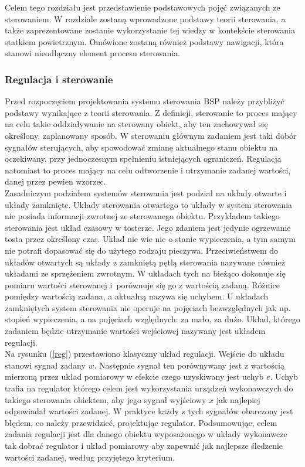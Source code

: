 Celem tego rozdziału jest przedstawienie podstawowych pojęć związanych ze sterowaniem. W rozdziale zostaną wprowadzone podstawy teorii sterowania, a także zaprezentowane zostanie wykorzystanie tej wiedzy w kontekście sterowania statkiem powietrznym. Omówione zostaną również podstawy nawigacji, która stanowi nieodłączny element procesu sterowania.

\subsubsection{Regulacja i sterowanie}

Przed rozpoczęciem projektowania systemu sterowania BSP należy przybliżyć podstawy wynikające z teorii sterowania. Z definicji, sterowanie to proces mający na celu takie oddziaływanie na sterowany obiekt, aby ten zachowywał się określony, zaplanowany sposób. W sterowaniu głównym zadaniem jest taki dobór sygnałów sterujących, aby spowodować zmianę aktualnego stanu obiektu na oczekiwany, przy jednoczesnym spełnieniu istniejących ograniczeń. Regulacja natomiast to proces mający na celu odtworzenie i utrzymanie zadanej wartości, danej przez pewien wzorzec.\\

Zasadniczym podziałem systemów sterowania jest podział na układy otwarte i układy zamknięte. Układy sterowania otwartego to układy w system sterowania nie posiada informacji zwrotnej ze sterowanego obiektu. Przykładem takiego sterowania jest układ czasowy w tosterze. Jego zdaniem jest jedynie ogrzewanie tosta przez określony czas. Układ nie wie nic o stanie wypieczenia, a tym samym nie potrafi dopasować się do użytego rodzaju pieczywa. Przeciwieństwem do układów otwartych są układy z zamkniętą pętlą sterowania nazywane również układami ze sprzężeniem zwrotnym. W układach tych na bieżąco dokonuje się pomiaru wartości sterowanej i~porównuje się go z wartością zadaną. Różnice pomiędzy wartością zadana, a aktualną nazywa się uchybem. U układach zamkniętych system sterowania nie operuje na pojęciach bezwzględnych jak np. stopień wypieczenia, a na pojęciach względnych: za mało, za dużo. Układ, którego zadaniem będzie utrzymanie wartości wejściowej nazywany jest układem regulacji.\\

Na rysunku (\ref{reg}) przestawiono klasyczny układ regulacji.  Wejście do układu stanowi sygnał zadany $w$. Następnie sygnał ten porównywany jest z wartością mierzoną przez układ pomiarowy w efekcie czego uzyskiwany jest uchyb $e$. Uchyb trafia na regulator którego celem jest wykorzystania urządzeń wykonawczych do takiego sterowania obiektem, aby jego sygnał wyjściowy $x$ jak najlepiej odpowiadał wartości zadanej. W praktyce każdy z tych sygnałów obarczony jest błędem, co należy przewidzieć, projektując regulator. Podsumowując, celem zadania regulacji jest dla danego obiektu wyposażonego w układy wykonawcze tak dobrać regulator i układ pomiarowy aby zapewnić jak najlepsze śledzenie wartości zadanej, według przyjętego kryterium.

